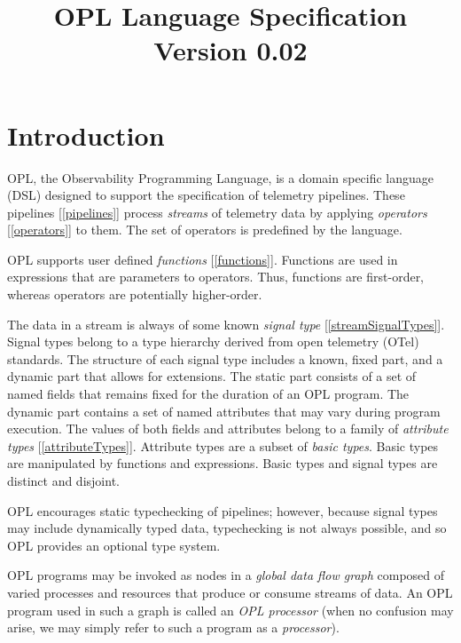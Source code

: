 \documentclass{article}
\begin{document}
\title{OPL Language Specification\\
{\large Version 0.02}
}
\maketitle

\tableofcontents

\section{Introduction}
\label{introduction}

OPL, the Observability Programming Language, is a domain specific language (DSL) designed to support the specification of telemetry pipelines. These pipelines [\ref{pipelines}] process {\em streams} of telemetry data by applying  {\em operators} [\ref{operators}] to them.  The set of operators is predefined by the language.

OPL supports user defined {\em functions} [\ref{functions}].  Functions are used in expressions that are parameters to operators. Thus, functions are first-order, whereas operators are potentially higher-order. 

The data in a stream is always of some known {\em signal type} [\ref{streamSignalTypes}]. Signal types belong to a type hierarchy derived from open telemetry (OTel) standards. The structure of each signal type includes a known, fixed part, and a dynamic part that allows for extensions. The static part consists of a set of named fields that remains fixed for the duration of an OPL program. The dynamic part contains a set of named attributes that may vary during program execution. The values  of both fields and attributes belong to a family of {\em attribute types} [\ref{attributeTypes}]. Attribute types are a subset of {\em basic types}. Basic types are manipulated  by functions and expressions.  Basic types and signal types are distinct and disjoint.


OPL encourages static typechecking of pipelines; however, because signal types may include dynamically typed data, typechecking is not always possible, and so OPL provides an optional type system.

OPL programs may be invoked as nodes in a {\em global data flow graph} composed of varied processes and resources that produce or consume streams of data. An OPL program used in such a graph is called an {\em OPL processor} (when no confusion may arise, we may simply refer to such a program as a {\em processor}).
\end{document}
